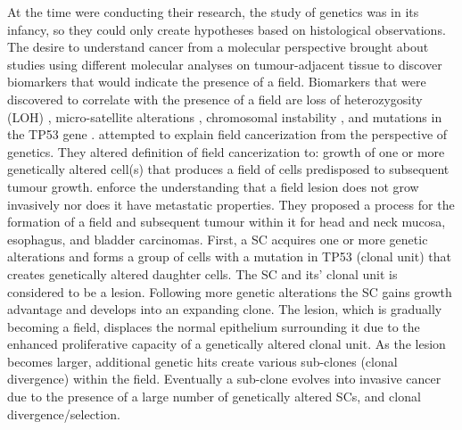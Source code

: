 \documentclass[\main/thesis.tex]{subfiles}
\begin{document}
At the time \textcite{Slaughter} were conducting their research, the study of genetics was in its infancy, so they could only create hypotheses based on histological observations. The desire to understand cancer from a molecular perspective brought about studies using different molecular analyses on tumour-adjacent tissue to discover biomarkers that would indicate the presence of a field. Biomarkers that were discovered to correlate with the presence of a field are loss of heterozygosity (LOH) \parencite{Tabor062001}, micro-satellite alterations \parencite{Tabor062001}, chromosomal instability \parencite{Hittelman}, and mutations in the TP53 gene \parencite{Brennan,VanHouten}. \textcite{Braakhuis} attempted to explain field cancerization from the perspective of genetics. They altered \textcite{Slaughter} definition of field cancerization to: growth of one or more genetically altered cell(s) that produces a field of cells predisposed to subsequent tumour growth. \textcite{Braakhuis} enforce the understanding that a field lesion does not grow invasively nor does it have metastatic properties. They proposed a process for the formation of a field and subsequent tumour within it for head and neck mucosa, esophagus, and bladder carcinomas. First, a SC acquires one or more genetic alterations and forms a group of cells with a mutation in TP53 (clonal unit) that creates genetically altered daughter cells. The SC and its' clonal unit is considered to be a lesion. Following more genetic alterations the SC gains growth advantage and develops into an expanding clone. The lesion, which is gradually becoming a field, displaces the normal epithelium surrounding it due to the enhanced proliferative capacity of a genetically altered clonal unit. As the lesion becomes larger, additional genetic hits create various sub-clones (clonal divergence) within the field. Eventually a sub-clone evolves into invasive cancer due to the presence of a large number of genetically altered SCs, and clonal divergence/selection. 
\end{document}

